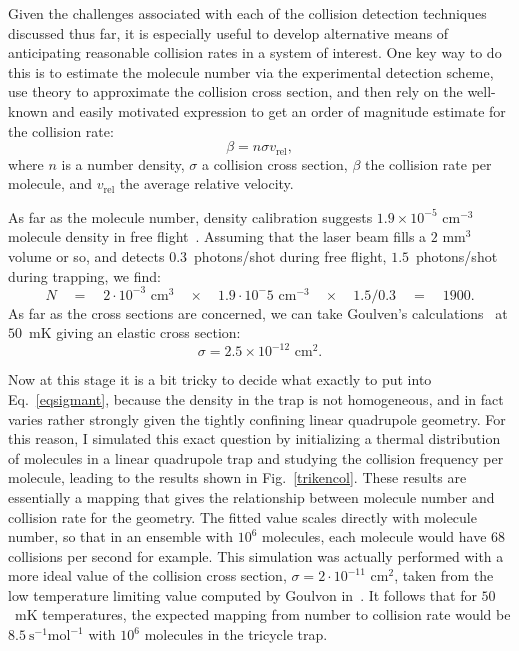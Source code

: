 Given the challenges associated with each of the collision detection techniques discussed thus far, it is especially useful to develop alternative means of anticipating reasonable collision rates in a system of interest.
One key way to do this is to estimate the molecule number via the experimental detection scheme, use theory to approximate the collision cross section, and then rely on the well-known and easily motivated expression to get an order of magnitude estimate for the collision rate:
\begin{equation}
\beta = n\sigma v_\text{rel},\label{eqsigmant}
\end{equation}
where $n$ is a number density, $\sigma$ a collision cross section, $\beta$ the collision rate per molecule, and $v_\text{rel}$ the average relative velocity.

As far as the molecule number, density calibration suggests $1.9\times10^{-5}\text{ cm}^{-3}$ molecule density in free flight~\citep[Sec.~4.6]{WuThesis2019}. Assuming that the laser beam fills a $2\text{ mm}^3$ volume or so, and detects $0.3$~photons/shot during free flight, $1.5$~photons/shot during trapping, we find:
\begin{equation}
N \quad = \quad 2\cdot10^{-3}\text{ cm}^3\quad\times\quad 1.9\cdot10^-5\text{ cm}^{-3}\quad\times\quad 1.5/0.3 \quad=\quad 1900.
\end{equation}
As far as the cross sections are concerned, we can take Goulven's calculations~\citep[Inset of Fig.~1b]{Stuhl2012evap} at $50$~mK giving an elastic cross section: 
\begin{equation}
\sigma = 2.5\times10^{-12}\text{ cm}^2.
\end{equation}

Now at this stage it is a bit tricky to decide what exactly to put into Eq.~\ref{eqsigmant}, because the density in the trap is not homogeneous, and in fact varies rather strongly given the tightly confining linear quadrupole geometry.
For this reason, I simulated this exact question by initializing a thermal distribution of molecules in a linear quadrupole trap and studying the collision frequency per molecule, leading to the results shown in Fig.~\ref{trikencol}.
These results are essentially a mapping that gives the relationship between molecule number and collision rate for the geometry.
The fitted value scales directly with molecule number, so that in an ensemble with $10^6$ molecules, each molecule would have $68$ collisions per second for example.
This simulation was actually performed with a more ideal value of the collision cross section, $\sigma = 2\cdot10^{-11}\text{ cm}^2$, taken from the low temperature limiting value computed by Goulvon in~\citep[Fig.~1b]{Stuhl2012evap}.
It follows that for $50$~mK temperatures, the expected mapping from number to collision rate would be $8.5~\text{s}^{-1}\text{mol}^{-1}$ with $10^6$ molecules in the tricycle trap.

